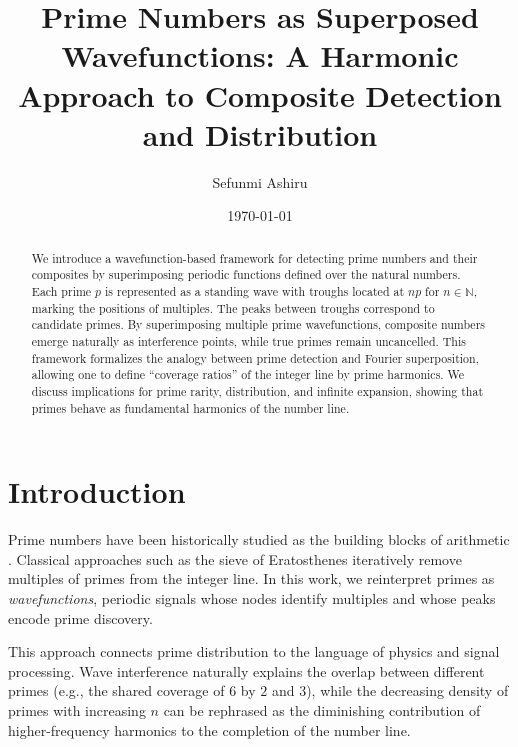 \documentclass[reprint,amsmath,amssymb,aps,pra]{revtex4-2}
\newcommand{\N}{\mathbb{N}}                   %
\begin{document}
\title{Prime Numbers as Superposed Wavefunctions: A Harmonic Approach to Composite Detection and Distribution}

\author{Sefunmi Ashiru}

\date{\today}

\begin{abstract}
We introduce a wavefunction-based framework for detecting prime numbers and their composites by superimposing periodic functions defined over the natural numbers. Each prime $p$ is represented as a standing wave with troughs located at $n p$ for $n \in \N$, marking the positions of multiples. The peaks between troughs correspond to candidate primes. By superimposing multiple prime wavefunctions, composite numbers emerge naturally as interference points, while true primes remain uncancelled. This framework formalizes the analogy between prime detection and Fourier superposition, allowing one to define ``coverage ratios'' of the integer line by prime harmonics. We discuss implications for prime rarity, distribution, and infinite expansion, showing that primes behave as fundamental harmonics of the number line. 
\end{abstract}

\maketitle

\section{Introduction}
Prime numbers have been historically studied as the building blocks of arithmetic \cite{HardyWright}. Classical approaches such as the sieve of Eratosthenes iteratively remove multiples of primes from the integer line. In this work, we reinterpret primes as \emph{wavefunctions}, periodic signals whose nodes identify multiples and whose peaks encode prime discovery.

This approach connects prime distribution to the language of physics and signal processing. Wave interference naturally explains the overlap between different primes (e.g., the shared coverage of $6$ by $2$ and $3$), while the decreasing density of primes with increasing $n$ can be rephrased as the diminishing contribution of higher-frequency harmonics to the completion of the number line.
\end{document}
